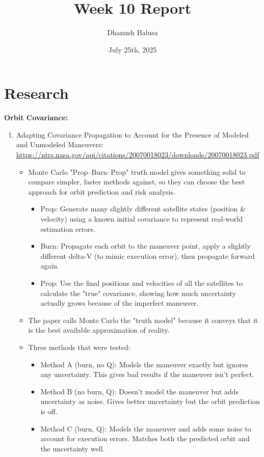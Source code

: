 \documentclass[12pt]{report}
\title{Week 10 Report}
\author{Dhanush Balusa}
\date{July 25th, 2025}
\begin{document}
\maketitle

\chapter*{Research}

\noindent \textbf{Orbit Covariance:}
\begin{enumerate}

  \item Adapting Covariance Propagation to Account for the Presence of Modeled and Unmodeled Maneuvers: \url{https://ntrs.nasa.gov/api/citations/20070018023/downloads/20070018023.pdf}

  \begin{itemize}
    \item Monte Carlo "Prop–Burn–Prop" truth model gives something solid to compare simpler, faster methods against, so they can choose the best approach for orbit prediction and risk analysis.
    \begin{itemize}
      \item Prop: Generate many slightly different satellite states (position \& velocity) using a known initial covariance to represent real-world estimation errors.
      \item Burn: Propagate each orbit to the maneuver point, apply a slightly different delta-V (to mimic execution error), then propagate forward again.
      \item Prop: Use the final positions and velocities of all the satellites to calculate the "true" covariance, showing how much uncertainty actually grows because of the imperfect maneuver.
    \end{itemize}
    \item  The paper calls Monte Carlo the "truth model" because it conveys that it is the best available approximation of reality.
    \item Three methods that were tested:
    \begin{itemize}
      \item Method A (burn, no Q): Models the maneuver exactly but ignores any uncertainty. This gives bad results if the maneuver isn’t perfect.
      \item Method B (no burn, Q): Doesn’t model the maneuver but adds uncertainty as noise. Gives better uncertainty but the orbit prediction is off.
      \item Method C (burn, Q): Models the maneuver and adds some noise to account for execution errors. Matches both the predicted orbit and the uncertainty well.

\end{itemize}
\end{itemize}
\end{enumerate}
\end{document}
